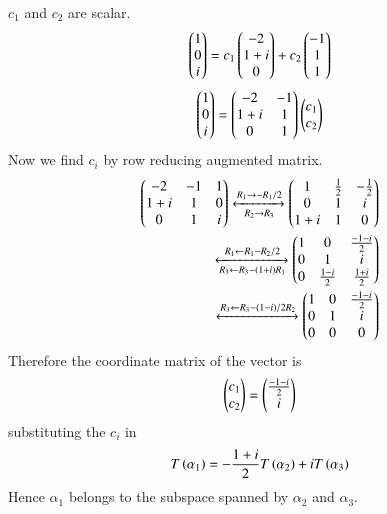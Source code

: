 \documentclass[journal,12pt,twocolumn]{IEEEtran}
\begin{document}
$c_1$ and $c_2$ are scalar.
\begin{align}
 \begin{pmatrix}1\\0\\i\end{pmatrix}=c{_1}\begin{pmatrix}-2\\1+i\\0\end{pmatrix}+c{_2}\begin{pmatrix}-1\\1\\1\end{pmatrix}
\end{align}
\begin{align}
  \begin{pmatrix}1\\0\\i\end{pmatrix}=\begin{pmatrix}-2&-1\\1+i&1\\0&1\end{pmatrix}\begin{pmatrix}c{_1}\\c{_2}\end{pmatrix}
\end{align}
 Now we find $c{_i}$ by row reducing augmented matrix.
\begin{align}
    \begin{pmatrix}-2&-1&1\\1+i&1&0\\0&1&i\end{pmatrix}
    \xleftrightarrow[R_2\rightarrow R_3]{R_1\rightarrow -R_1/2}\begin{pmatrix}1&\frac{1}{2}&-\frac{1}{2}\\0&1&i\\1+i&1&0\end{pmatrix}\\
    \xleftrightarrow[R_3\leftarrow R_3-(1+i)R_1]{R_1\leftarrow R_1-R_2/2}\begin{pmatrix}1&0&\frac{-1-i}{2}\\0&1&i\\0&\frac{1-i}{2}&\frac{1+i}{2}\end{pmatrix}\\
    \xleftrightarrow{R_3\leftarrow R_3-(1-i)/2R_2}\begin{pmatrix}1&0&\frac{-1-i}{2}\\0&1&i\\0&0&0\end{pmatrix}
\end{align}
Therefore the coordinate matrix of the vector is 
\begin{align}
    \begin{pmatrix}c{_1}\\c{_2}\end{pmatrix}=
     \begin{pmatrix}\frac{-1-i}{2}\\i\end{pmatrix}
\end{align}
substituting the $c_{i}$ in 
\begin{align}
   T\left(\alpha_1\right)=-\frac{1+i}{2}T\left(\alpha_2\right) +iT\left(\alpha_3\right) 
\end{align}
 Hence $\alpha_1$ belongs to the subspace spanned by $\alpha_2$
and $\alpha_3$.
\end{document}
